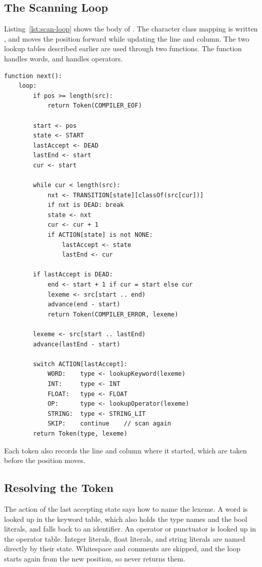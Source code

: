 \subsection{The Scanning Loop}

Listing~\ref{lst:scan-loop} shows the body of . The character class
mapping is written , and  moves the position
forward while updating the line and column. The two lookup tables described
earlier are used through two functions. The function 
handles words, and  handles operators.

\begin{lstlisting}[style=pseudocode, float=tbp,
    caption={The scanning loop of the lexer.}, label=lst:scan-loop]
function next():
    loop:
        if pos >= length(src):
            return Token(COMPILER_EOF)

        start <- pos
        state <- START
        lastAccept <- DEAD
        lastEnd <- start
        cur <- start

        while cur < length(src):
            nxt <- TRANSITION[state][classOf(src[cur])]
            if nxt is DEAD: break
            state <- nxt
            cur <- cur + 1
            if ACTION[state] is not NONE:
                lastAccept <- state
                lastEnd <- cur

        if lastAccept is DEAD:
            end <- start + 1 if cur = start else cur
            lexeme <- src[start .. end)
            advance(end - start)
            return Token(COMPILER_ERROR, lexeme)

        lexeme <- src[start .. lastEnd)
        advance(lastEnd - start)

        switch ACTION[lastAccept]:
            WORD:    type <- lookupKeyword(lexeme)
            INT:     type <- INT
            FLOAT:   type <- FLOAT
            OP:      type <- lookupOperator(lexeme)
            STRING:  type <- STRING_LIT
            SKIP:    continue    // scan again
        return Token(type, lexeme)
\end{lstlisting}

Each token also records the line and column where it started, which are taken
before the position moves.

\subsection{Resolving the Token}

The action of the last accepting state says how to name the lexeme. A word is
looked up in the keyword table, which also holds the type names and the bool
literals, and falls back to an identifier. An operator or punctuator is looked
up in the operator table. Integer literals, float literals, and string literals 
are named directly by their state. Whitespace and comments are skipped, and the 
loop starts again from the new position, so  never returns them.


